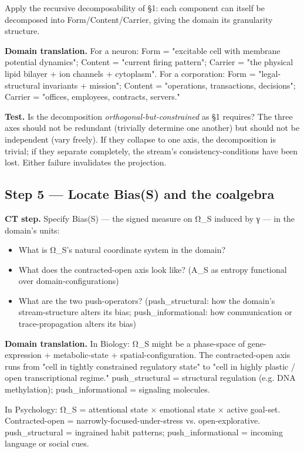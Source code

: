 \documentclass[11pt, openany]{book}
\begin{document}
Apply the recursive decomposability of §1: each component can itself be decomposed into Form/Content/Carrier, giving the domain its granularity structure.

\textbf{Domain translation.} For a neuron: Form = "excitable cell with membrane potential dynamics"; Content = "current firing pattern"; Carrier = "the physical lipid bilayer + ion channels + cytoplasm". For a corporation: Form = "legal-structural invariants + mission"; Content = "operations, transactions, decisions"; Carrier = "offices, employees, contracts, servers."

\textbf{Test.} Is the decomposition \textit{orthogonal-but-constrained} as §1 requires? The three axes should not be redundant (trivially determine one another) but should not be independent (vary freely). If they collapse to one axis, the decomposition is trivial; if they separate completely, the stream's consistency-conditions have been lost. Either failure invalidates the projection.

\subsection{Step 5 --- Locate Bias(S) and the coalgebra}

\textbf{CT step.} Specify Bias(S) --- the signed measure on Ω\_\allowbreak{}S induced by γ --- in the domain's units:

\begin{itemize}
\item What is Ω\_\allowbreak{}S's natural coordinate system in the domain?
\item What does the contracted-open axis look like? (A\_\allowbreak{}S as entropy functional over domain-configurations)
\item What are the two push-operators? (push\_\allowbreak{}structural: how the domain's stream-structure alters its bias; push\_\allowbreak{}informational: how communication or trace-propagation alters its bias)
\end{itemize}

\textbf{Domain translation.} In Biology: Ω\_\allowbreak{}S might be a phase-space of gene-expression + metabolic-state + spatial-configuration. The contracted-open axis runs from "cell in tightly constrained regulatory state" to "cell in highly plastic / open transcriptional regime." push\_\allowbreak{}structural = structural regulation (e.g. DNA methylation); push\_\allowbreak{}informational = signaling molecules.

In Psychology: Ω\_\allowbreak{}S = attentional state × emotional state × active goal-set. Contracted-open = narrowly-focused-under-stress vs. open-explorative. push\_\allowbreak{}structural = ingrained habit patterns; push\_\allowbreak{}informational = incoming language or social cues.
\end{document}
